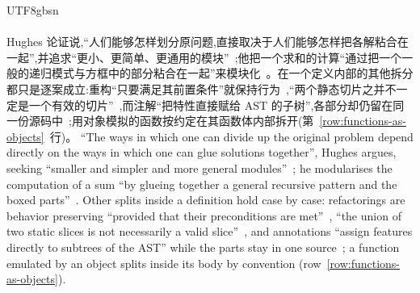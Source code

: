 \begin{CJK*}{UTF8}{gbsn}
\paragraph{}
\ifPaperChinese
Hughes 论证说,``人们能够怎样划分原问题,直接取决于人们能够怎样把各解粘合在一起'',并追求``更小、更简单、更通用的模块''~\cite[\S~2]{hughes1989-why-functional-programming-matters};他把一个求和的计算``通过把一个一般的递归模式与方框中的部分粘合在一起''来模块化~\cite[\S~3]{hughes1989-why-functional-programming-matters}。在一个定义内部的其他拆分都只是逐案成立:重构``只要满足其前置条件''就保持行为~\cite[第~iii~页]{opdyke1992-refactoring-frameworks},``两个静态切片之并不一定是一个有效的切片''~\cite{delucia2003-unions-of-slices},而注解``把特性直接赋给 AST 的子树'',各部分却仍留在同一份源码中~\cite[\S~4.2]{kastner2008-granularity-software-product-lines};用对象模拟的函数按约定在其函数体内部拆开(第~\ref{row:functions-as-objects}~行)。
\else
``The ways in which one can divide up the original problem depend directly on the ways in which one can
glue solutions together'', Hughes argues, seeking ``smaller and simpler and more general
modules''~\cite[\S~2]{hughes1989-why-functional-programming-matters}; he modularises the computation of
a sum ``by glueing together a general recursive pattern and the boxed
parts''~\cite[\S~3]{hughes1989-why-functional-programming-matters}.
Other splits inside a definition hold case by case: refactorings are behavior preserving ``provided that
their preconditions are met''~\cite[p.~iii]{opdyke1992-refactoring-frameworks}, ``the union of two
static slices is not necessarily a valid slice''~\cite{delucia2003-unions-of-slices}, and annotations
``assign features directly to subtrees of the AST'' while the parts stay in one
source~\cite[\S~4.2]{kastner2008-granularity-software-product-lines}; a function emulated by an object
splits inside its body by convention (row~\ref{row:functions-as-objects}).
\fi


\end{CJK*}
